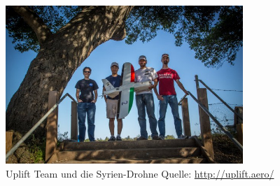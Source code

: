 \begin{figure}[H]
\centering
\includegraphics[width=0.8\textwidth] {images/SyriaUplift.jpg}
\caption{Uplift Team und die Syrien-Drohne Quelle: \protect\url{http://uplift.aero/}}
\label{fig:uplift}
\end{figure}




